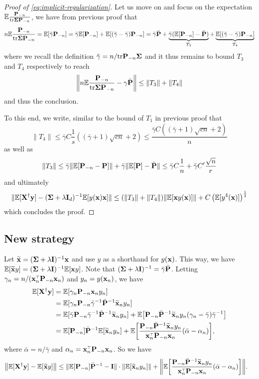 \documentclass[11pt]{article}
\begin{document}
\begin{proof}[Proof of \eqref{eq:implicit-regularization}]
Let us move on and focus on the expectation $\mathbb E \frac{\mathbf P_{-n} }{ \mathrm{tr} \mathbf{\Sigma} \mathbf P_{-n} }$, we have from previous proof that
\[
  n\mathbb E \frac{\mathbf P_{-n} }{ \mathrm{tr} \mathbf{\Sigma} \mathbf P_{-n} } = \mathbb E[ \tilde \gamma \mathbf P_{-n} ] =  \bar \gamma \mathbb E[\mathbf P_{-n}] + \mathbb E [(\tilde \gamma - \bar \gamma) \mathbf P_{-n}] = \bar \gamma \bar {\mathbf P} + \underbrace{\bar \gamma ( \mathbb E[\mathbf P_{-n}] - \bar {\mathbf P})}_{T_3} + \underbrace{\mathbb E [(\tilde \gamma - \bar \gamma) \mathbf P_{-n}]}_{T_4}
\]
where we recall the definition $\tilde \gamma = n/\mathrm{tr} \mathbf P_{-n} \mathbf{\Sigma}$ and it thus remains to bound $T_3$ and $T_4$ respectively to reach
\begin{align*}
  \left\| n \mathbb E \frac{\mathbf P_{-n} }{ \mathrm{tr} \mathbf{\Sigma} \mathbf P_{-n} } - \gamma \bar {\mathbf P} \right\| \le \| T_3 \| + \| T_4 \|
\end{align*}
and thus the conclusion.

To this end, we write, similar to the bound of $T_1$ in previous proof that
\[
  \| T_4 \| \le \bar \gamma C \frac1s ( (\bar \gamma + 1) \sqrt{cn} + 2 ) \le \frac{ \bar \gamma C ( (\bar \gamma + 1) \sqrt{cn} + 2 ) }n
\]
as well as
\[
  \| T_3 \| \le \bar \gamma \| \mathbb E[\mathbf P_{-n} - \mathbf P] \| + \bar \gamma \| \mathbb E[\mathbf P] - \bar {\mathbf P} \| \le \bar \gamma C \frac1n + \bar \gamma C' \frac{\sqrt n}{r}
\]
and ultimately
\[
  \| \E[\X^\dagger \y] - (\Sigmab + \lambda \I_d)^{-1} \E[y(\x) \x] \| \le (\| T_3 \| + \| T_4 \|) \| \E [\x y(\x) ] \| + C \left( \E[y^4(\x)] \right)^{\frac14} %
\]
which concludes the proof.
\end{proof}


\subsection{New strategy}

Let $\widetilde{\mathbf x}=(\mathbf{\Sigma}+\lambda\mathbf I)^{-1}\mathbf x$ and use $y$ as a shorthand for
$y(\mathbf x)$. This way, we have $\mathbb E[\widetilde{\mathbf x} y ]=(\mathbf{\Sigma}+\lambda\mathbf I)^{-1}\mathbb E[\mathbf x y]$.
Note that $(\mathbf{\Sigma}+\lambda\mathbf I)^{-1} = \bar\gamma\bar{\mathbf P}$. Letting
$\gamma_n=n/(\x_n^\top\P_{-n}\x_n)$ and $y_n=y(\mathbf x_n)$, we have
\begin{align*}
  \E[\X^\dagger\y]
  & = \E[\gamma_n\P_{-n}\x_ny_n]\\
  &= \E[\gamma_n\P_{-n}\bar\gamma^{-1}\bar\P^{-1}\xbt_ny_n]\\
  &=\E[\bar\gamma\P_{-n}\bar\gamma^{-1}\bar\P^{-1}\xbt_n y_n] +
    \E\big[\P_{-n}\bar\P^{-1}\xbt_ny_n(\gamma_n-\bar\gamma)\bar\gamma^{-1}\big] \\
  &=\E[\P_{-n}]\bar\P^{-1}\E[\xbt_ny_n]
    + \E\bigg[\frac{\P_{-n}\bar\P^{-1}\xbt_ny_n}{\x_n^\top\P_{-n}\x_n}(\bar\alpha-\alpha_n)\bigg],
\end{align*}
where $\bar\alpha=n/\bar\gamma$ and
$\alpha_n=\x_n^\top\P_{-n}\x_n$. So we have
\begin{align*}
  \big\|\E[\X^\dagger\y]-\E[\xbt y]\big\|
  &\leq \|\E[\P_{-n}]\bar\P^{-1}-\I\|\cdot\|\E[\xbt_ny_n]\| +
    \bigg\|\E\bigg[\frac{\P_{-n}\bar\P^{-1}\xbt_ny_n}{\x_n^\top\P_{-n}\x_n}
    (\bar\alpha-\alpha_n)\bigg]\bigg\|.
\end{align*}
\end{document}
